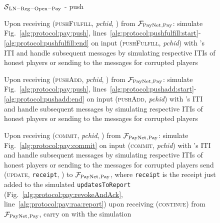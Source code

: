 \begin{figure}[H]
  \begin{simulatorbox}{$\mathcal{S}{}_{\mathrm{LN - Reg - Open - Pay}}$ - push}
    \begin{algorithmic}[1]
      \State Upon receiving (\textsc{pushFulfill}, \textit{pchid}, \alice) from
      $\mathcal{F}_{\mathrm{PayNet}}{}_{\mathrm{, Pay}}$:
      \Indent
        \State simulate Fig.~\ref{alg:protocol:pay:push},
        lines~\ref{alg:protocol:pushfulfill:start}-\ref{alg:protocol:pushfulfill:end}
        on input (\textsc{pushFulfill}, \textit{pchid}) with \alice's ITI and
        handle subsequent messages by simulating respective ITIs of honest
        players or sending to \adversary{} the messages for corrupted players
        \label{alg:sim:push:fulfill}
      \EndIndent
      \Statex

      \State Upon receiving (\textsc{pushAdd}, \textit{pchid}, \alice) from
      $\mathcal{F}_{\mathrm{PayNet}}{}_{\mathrm{, Pay}}$:
      \Indent
        \State simulate Fig.~\ref{alg:protocol:pay:push},
        lines~\ref{alg:protocol:pushadd:start}-\ref{alg:protocol:pushadd:end} on
        input (\textsc{pushAdd}, \textit{pchid}) with \alice's ITI and handle
        subsequent messages by simulating respective ITIs of honest players or
        sending to \adversary{} the messages for corrupted players
        \label{alg:sim:push:add}
      \EndIndent
      \Statex

      \State Upon receiving (\textsc{commit}, \textit{pchid}, \alice) from
      $\mathcal{F}_{\mathrm{PayNet}}{}_{\mathrm{, Pay}}$:
      \Indent
        \State simulate Fig.~\ref{alg:protocol:pay:commit} on input
        (\textsc{commit}, \textit{pchid}) with \alice's ITI and handle
        subsequent messages by simulating respective ITIs of honest players or
        sending to \adversary{} the messages for corrupted players
        \label{alg:sim:push:commit}
          \State send (\textsc{update}, \texttt{receipt}, \alice) to
          $\mathcal{F}_{\mathrm{PayNet}}{}_{\mathrm{, Pay}}$, where \texttt{receipt} is the receipt
          just added to the simulated \texttt{updatesToReport}
          (Fig.~\ref{alg:protocol:pay:revokeAndAck},
          line~\ref{alg:protocol:pay:raa:report})
          \label{alg:sim:push:report}
          \State upon receiving (\textsc{continue}) from $\mathcal{F}_{\mathrm{PayNet}}{}_{\mathrm{,
          Pay}}$, carry on with the simulation
        \EndIf
      \EndIndent
    \end{algorithmic}
  \end{simulatorbox}
  \caption{}
  \label{alg:sim:push}
\end{figure}

